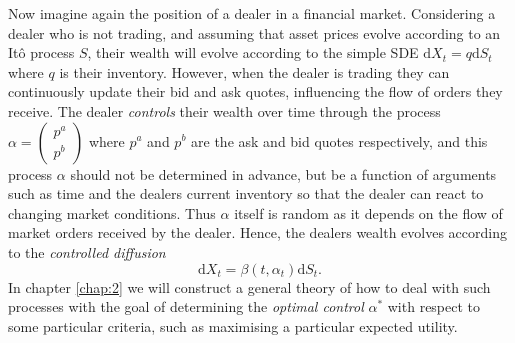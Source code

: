 Now imagine again the position of a dealer in a financial market. Considering a dealer
who is not trading, and assuming that asset prices evolve
according to an It\^{o} process $S$, their wealth will evolve according to the simple 
SDE $\mathrm dX_t=q\mathrm dS_t$ where $q$ is their inventory. However, when the dealer
is trading they can 
continuously update their bid and ask quotes, influencing the flow of orders 
they receive. The dealer \emph{controls} their wealth over time through the process $\alpha=\begin{pmatrix}p^a\\p^b\end{pmatrix}$
where $p^a$ and $p^b$ are the ask and bid quotes respectively, and this process 
$\alpha$ should not be determined in advance, but be a function of arguments such 
as time and the dealers current inventory so that the dealer can react to changing 
market conditions. Thus $\alpha$ itself is random as it depends on the 
flow of market orders received by the dealer.
Hence, the dealers wealth evolves according to the \emph{controlled diffusion}
\begin{equation*}
    \mathrm dX_t=\beta(t,\alpha_t)\mathrm dS_t.
\end{equation*}
In chapter \ref{chap:2} we will construct a general theory of how to deal with 
such processes with the goal of determining the \emph{optimal control} $\alpha^*$ with 
respect to some particular criteria, such as maximising a particular expected utility.
